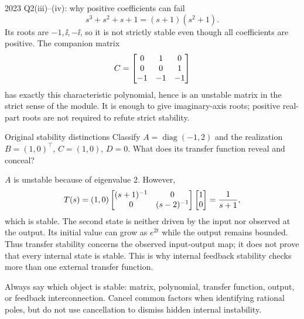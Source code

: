 \begin{worked}{2023 Q2(iii)--(iv): why positive coefficients can fail}
\[s^3+s^2+s+1=(s+1)(s^2+1).\]
Its roots are $-1,\ii,-\ii$, so it is not strictly stable even though all coefficients are positive. The companion matrix
\[C=\begin{bmatrix}0&1&0\\0&0&1\\-1&-1&-1\end{bmatrix}\]
has exactly this characteristic polynomial, hence is an unstable matrix in the strict sense of the module. It is enough to give imaginary-axis roots; positive real-part roots are not required to refute strict stability.
\end{worked}
\begin{question}{Original stability distinctions}
Classify $A=\operatorname{diag}(-1,2)$ and the realization $B=(1,0)^{\top}$, $C=(1,0)$, $D=0$. What does its transfer function reveal and conceal?
\end{question}
\begin{answer}
$A$ is unstable because of eigenvalue $2$. However,
\[T(s)=(1,0)\begin{bmatrix}(s+1)^{-1}&0\\0&(s-2)^{-1}\end{bmatrix}\begin{bmatrix}1\\0\end{bmatrix}=\frac1{s+1},\]
which is stable. The second state is neither driven by the input nor observed at the output. Its initial value can grow as $e^{2t}$ while the output remains bounded. Thus transfer stability concerns the observed input-output map; it does not prove that every internal state is stable. This is why internal feedback stability checks more than one external transfer function.
\end{answer}
\begin{tip}
Always say which object is stable: matrix, polynomial, transfer function, output, or feedback interconnection. Cancel common factors when identifying rational poles, but do not use cancellation to dismiss hidden internal instability.
\end{tip}

